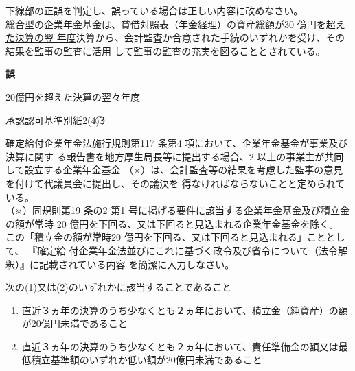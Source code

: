 \begin{truefalse}[年金1 2018 問題1(1)\textcircled{3}]
  下線部の正誤を判定し、誤っている場合は正しい内容に改めなさい。
  \\ 

  総合型の企業年金基金は、貸借対照表（年金経理）の資産総額が\underline{30 億円を超えた決算の翌
年度}決算から、会計監査か合意された手続のいずれかを受け、その結果を監事の監査に活用
して監事の監査の充実を図ることとされている。
\end{truefalse}

\begin{answerbox}
  \textbf{誤}

  20億円を超えた決算の翌々年度
\end{answerbox}

\begin{explanationbox}
  承認認可基準別紙2(4)\textcircled{3}
\end{explanationbox}

\begin{shortanswer}[年金1 2022 問題2(1)エ]
  確定給付企業年金法施行規則第117 条第4 項において、企業年金基金が事業及び決算に関す
る報告書を地方厚生局長等に提出する場合、2 以上の事業主が共同して設立する企業年金基金
（※）は、会計監査等の結果を考慮した監事の意見を付けて代議員会に提出し、その議決を
得なければならないことと定められている。
\\

（※）同規則第19 条の2 第1 号に掲げる要件に該当する企業年金基金及び積立金の額が常時
20 億円を下回る、又は下回ると見込まれる企業年金基金を除く。
\\

この「積立金の額が常時20 億円を下回る、又は下回ると見込まれる」こととして、 『確定給
付企業年金法並びにこれに基づく政令及び省令について（法令解釈）』に記載されている内容
を簡潔に入力しなさい。
\end{shortanswer}

\begin{answerbox}
  次の(1)又は(2)のいずれかに該当することであること

  \begin{enumerate}[(1)]
    \item 直近３ヵ年の決算のうち少なくとも２ヵ年において、積立金（純資産）の額が20億円未満であること
    \item 直近３ヵ年の決算のうち少なくとも２ヵ年において、責任準備金の額又は最低積立基準額のいずれか低い額が20億円未満であること
  \end{enumerate}
  
\end{answerbox}

